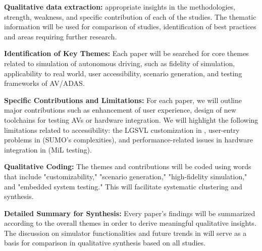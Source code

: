 \documentclass[lettersize,journal]{IEEEtran}
\begin{document}
\textbf{Qualitative data extraction:} appropriate insights in the methodologies, strength, weakness, and specific contribution of each of the studies. The thematic information will be used for comparison of studies, identification of best practices and areas requiring further research.

\textbf{Identification of Key Themes:} Each paper will be searched for core themes related to simulation of autonomous driving, such as fidelity of simulation, applicability to real world, user accessibility, scenario generation, and testing frameworks of AV/ADAS.

\textbf{Specific Contributions and Limitations:} For each paper, we will outline major contributions such as enhancement of user experience, design of new toolchains for testing AVs or hardware integration. We will highlight the following limitations related to accessibility: the LGSVL customization in \cite{ref51}, user-entry problems in \cite{ref54} (SUMO's complexities), and performance-related issues in hardware integration in \cite{ref55} (MiL testing).

\textbf{Qualitative Coding:} The themes and contributions will be coded using words that include "customizability," "scenario generation," "high-fidelity simulation," and "embedded system testing." This will facilitate systematic clustering and synthesis.

\textbf{Detailed Summary for Synthesis:} Every paper's findings will be summarized according to the overall themes in order to derive meaningful qualitative insights. The discussion on simulator functionalities and future trends in \cite{ref52} will serve as a basis for comparison in qualitative synthesis based on all studies.
\end{document}
